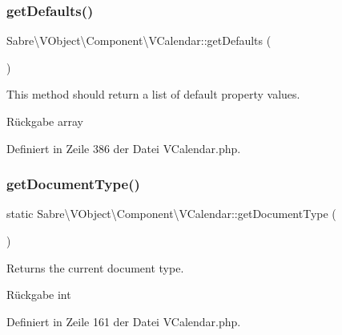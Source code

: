 \subsubsection{\texorpdfstring{get\+Defaults()}{getDefaults()}}
{\footnotesize\ttfamily Sabre\textbackslash{}\+V\+Object\textbackslash{}\+Component\textbackslash{}\+V\+Calendar\+::get\+Defaults (\begin{DoxyParamCaption}{ }\end{DoxyParamCaption})\hspace{0.3cm}{\ttfamily [protected]}}

This method should return a list of default property values.

\begin{DoxyReturn}{Rückgabe}
array 
\end{DoxyReturn}


Definiert in Zeile 386 der Datei V\+Calendar.\+php.

\mbox{\label{class_sabre_1_1_v_object_1_1_component_1_1_v_calendar_a26c70b7253373bedcc64c9886df4aafd}} 
\subsubsection{\texorpdfstring{get\+Document\+Type()}{getDocumentType()}}
{\footnotesize\ttfamily static Sabre\textbackslash{}\+V\+Object\textbackslash{}\+Component\textbackslash{}\+V\+Calendar\+::get\+Document\+Type (\begin{DoxyParamCaption}{ }\end{DoxyParamCaption})}

Returns the current document type.

\begin{DoxyReturn}{Rückgabe}
int 
\end{DoxyReturn}


Definiert in Zeile 161 der Datei V\+Calendar.\+php.

\mbox{\label{class_sabre_1_1_v_object_1_1_component_1_1_v_calendar_ab07a00ff63edb5b74b06f3876f4371da}} 

